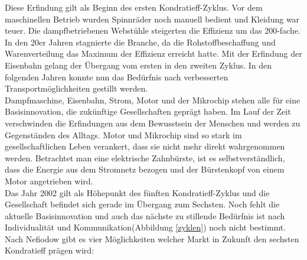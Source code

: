 Diese Erfindung gilt als Beginn des ersten Kondratieff-Zyklus. Vor dem maschinellen Betrieb wurden Spinnräder noch manuell bedient und Kleidung war teuer. Die dampfbetriebenen Webstühle steigerten
die Effizienz um das 200-fache. In den 20er Jahren stagnierte die Branche, da die Rohstoffbeschaffung und Warenverteilung das Maximum der Effizienz erreicht hatte. Mit der Erfindung der Eisenbahn gelang der Übergang vom ersten in den zweiten Zyklus. In den folgenden Jahren konnte nun das Bedürfnis nach verbesserten Transportmöglichkeiten gestillt werden.\\
Dampfmaschine, Eisenbahn, Strom, Motor und der Mikrochip stehen alle für eine Basisinnovation, die zukünftige Gesellschaften geprägt haben. Im Lauf der Zeit verschwinden die Erfindungen aus dem Bewusstsein der Menschen und werden zu Gegenständen des Alltags. Motor und Mikrochip sind so stark im gesellschaftlichen Leben verankert, dass sie nicht mehr direkt wahrgenommen werden. Betrachtet man eine elektrische Zahnbürste, ist es selbstverständlich, dass die Energie aus dem Stromnetz bezogen und der Bürstenkopf von einem Motor angetrieben wird.\\
Das Jahr 2002 gilt als Höhepunkt des fünften Kondratieff-Zyklus und die Gesellschaft befindet sich gerade im Übergang zum Sechsten. Noch fehlt die aktuelle Basisinnovation und auch das nächste zu stillende Bedürfnis ist nach Individualität und Kommunikation(Abbildung \ref{zyklen}) noch nicht bestimmt.\\
Nach Nefiodow \cite{nefiodow:gesundheit} gibt es vier Möglichkeiten welcher Markt in Zukunft den sechsten Kondratieff prägen wird:
